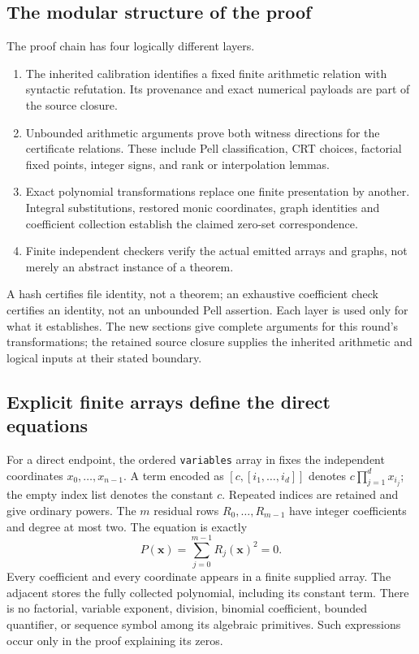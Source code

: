 \subsection{The modular structure of the proof}
The proof chain has four logically different layers.
\begin{enumerate}
\item The inherited calibration identifies a fixed finite arithmetic relation
with syntactic refutation. Its provenance and exact numerical payloads are
part of the source closure.
\item Unbounded arithmetic arguments prove both witness directions for the
certificate relations. These include Pell classification, CRT choices,
factorial fixed points, integer signs, and rank or interpolation lemmas.
\item Exact polynomial transformations replace one finite presentation by
another. Integral substitutions, restored monic coordinates, graph identities
and coefficient collection establish the claimed zero-set correspondence.
\item Finite independent checkers verify the actual emitted arrays and graphs,
not merely an abstract instance of a theorem.
\end{enumerate}
A hash certifies file identity, not a theorem; an exhaustive coefficient
check certifies an identity, not an unbounded Pell assertion. Each layer is
used only for what it establishes. The new sections give complete arguments
for this round's transformations; the retained source closure supplies
the inherited arithmetic and logical inputs at their stated boundary.

\subsection{Explicit finite arrays define the direct equations}
For a direct endpoint, the ordered \texttt{variables} array in
 fixes the independent coordinates
$x_0,\ldots,x_{n-1}$. A term encoded as $[c,[i_1,\ldots,i_d]]$ denotes
$c\prod_{j=1}^{d}x_{i_j}$; the empty index list denotes the constant $c$.
Repeated indices are retained and give ordinary powers. The $m$ residual
rows $R_0,\ldots,R_{m-1}$ have integer coefficients and degree at most two.
The equation is exactly
\begin{equation}\label{eq:sos}
 P(\boldsymbol{x})=\sum_{j=0}^{m-1}R_j(\boldsymbol{x})^2=0.
\end{equation}
Every coefficient and every coordinate appears in a finite supplied array.
The adjacent  stores the fully collected
polynomial, including its constant term. There is no factorial, variable
exponent, division, binomial coefficient, bounded quantifier, or sequence
symbol among its algebraic primitives. Such expressions occur only in the
proof explaining its zeros.

